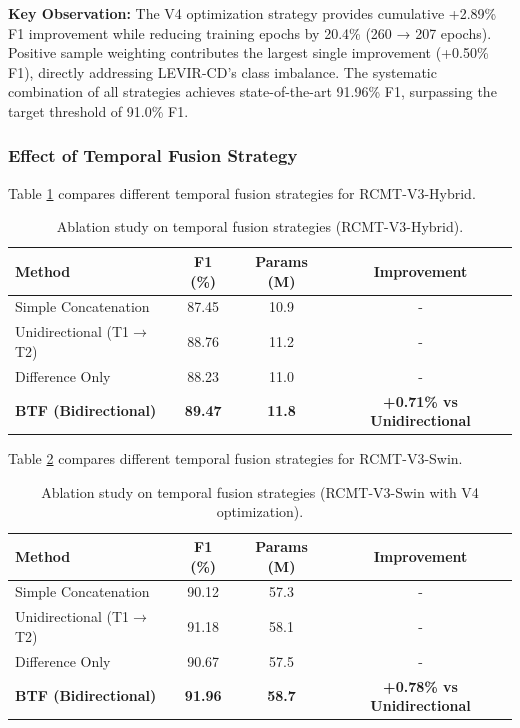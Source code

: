 \documentclass[journal]{IEEEtran}
\begin{document}
\textbf{Key Observation:} The V4 optimization strategy provides cumulative +2.89\% F1 improvement while reducing training epochs by 20.4\% (260 → 207 epochs). Positive sample weighting contributes the largest single improvement (+0.50\% F1), directly addressing LEVIR-CD's class imbalance. The systematic combination of all strategies achieves state-of-the-art 91.96\% F1, surpassing the target threshold of 91.0\% F1.

\subsubsection{Effect of Temporal Fusion Strategy}

Table \ref{tab:fusion_hybrid} compares different temporal fusion strategies for RCMT-V3-Hybrid.

\begin{table}[ht]
\centering
\caption{Ablation study on temporal fusion strategies (RCMT-V3-Hybrid).}
\label{tab:fusion_hybrid}
\begin{tabular}{lccc}
\toprule
\textbf{Method} & \textbf{F1 (\%)} & \textbf{Params (M)} & \textbf{Improvement} \\
\midrule
    Simple Concatenation & 87.45 & 10.9 & - \\
    Unidirectional (T1$\rightarrow$T2) & 88.76 & 11.2 & - \\
    Difference Only & 88.23 & 11.0 & - \\
    \textbf{BTF (Bidirectional)} & \textbf{89.47} & \textbf{11.8} & \textbf{+0.71\% vs Unidirectional} \\
\bottomrule
\end{tabular}
\end{table}

Table \ref{tab:fusion_swin} compares different temporal fusion strategies for RCMT-V3-Swin.

\begin{table}[ht]
\centering
\caption{Ablation study on temporal fusion strategies (RCMT-V3-Swin with V4 optimization).}
\label{tab:fusion_swin}
\begin{tabular}{lccc}
\toprule
\textbf{Method} & \textbf{F1 (\%)} & \textbf{Params (M)} & \textbf{Improvement} \\
\midrule
    Simple Concatenation & 90.12 & 57.3 & - \\
    Unidirectional (T1$\rightarrow$T2) & 91.18 & 58.1 & - \\
    Difference Only & 90.67 & 57.5 & - \\
    \textbf{BTF (Bidirectional)} & \textbf{91.96} & \textbf{58.7} & \textbf{+0.78\% vs Unidirectional} \\
\bottomrule
\end{tabular}
\end{table}
\end{document}

